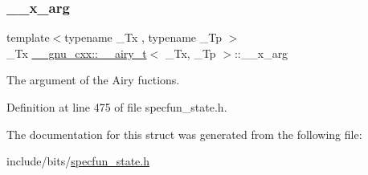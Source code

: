\subsubsection{\texorpdfstring{\+\_\+\+\_\+x\+\_\+arg}{\_\_x\_arg}}
{\footnotesize\ttfamily template$<$typename \+\_\+\+Tx , typename \+\_\+\+Tp $>$ \\
\+\_\+\+Tx \hyperlink{struct____gnu__cxx_1_1____airy__t}{\+\_\+\+\_\+gnu\+\_\+cxx\+::\+\_\+\+\_\+airy\+\_\+t}$<$ \+\_\+\+Tx, \+\_\+\+Tp $>$\+::\+\_\+\+\_\+x\+\_\+arg}



The argument of the Airy fuctions. 



Definition at line 475 of file specfun\+\_\+state.\+h.



The documentation for this struct was generated from the following file\+:\begin{DoxyCompactItemize}
\item 
include/bits/\hyperlink{specfun__state_8h}{specfun\+\_\+state.\+h}\end{DoxyCompactItemize}
